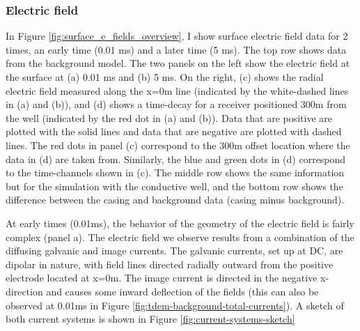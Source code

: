 \subsubsection{Electric field}

In Figure \ref{fig:surface_e_fields_overview}, I show surface electric field data for 2 times, an early time (0.01 ms) and a later time (5 ms). The top row shows data from the background model. The two panels on the left show the electric field at the surface at (a) 0.01 ms and (b) 5 ms. On the right, (c) shows the radial electric field measured along the x=0m line (indicated by the white-dashed lines in (a) and (b)), and (d) shows a time-decay for a receiver positioned 300m from the well (indicated by the red dot in (a) and (b)). Data that are positive are plotted with the solid lines and data that are negative are plotted with dashed lines. The red dots in panel (c) correspond to the 300m offset location where the data in (d) are taken from. Similarly, the blue and green dots in (d) correspond to the time-channels shown in (c). The middle row shows the same information but for the simulation with the conductive well, and the bottom row shows the difference between the casing and background data (casing minus background).




At early times (0.01ms), the behavior of the geometry of the electric field is fairly complex (panel a). The electric field we observe results from a combination of the diffusing galvanic and image currents. The galvanic currents, set up at DC, are dipolar in nature, with field lines directed radially outward from the positive electrode located at x=0m. The image current is directed in the negative x-direction and causes some inward deflection of the fields (this can also be observed at 0.01ms in Figure \ref{fig:tdem-background-total-currents}). A sketch of both current systems is shown in Figure \ref{fig:current-systems-sketch}




